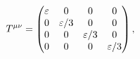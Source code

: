 {$\displaystyle
\special{dvisvgm:bbox new formula}
\special{dvisvgm:raw<!--start {?x} {?y} -->}
    T^{\mu\nu}=\begin{pmatrix}
\varepsilon&0&0&0\\
0&\varepsilon/3&0&0\\
0&0&\varepsilon/3&0\\
0&0&0&\varepsilon/3
\end{pmatrix},
$
}
